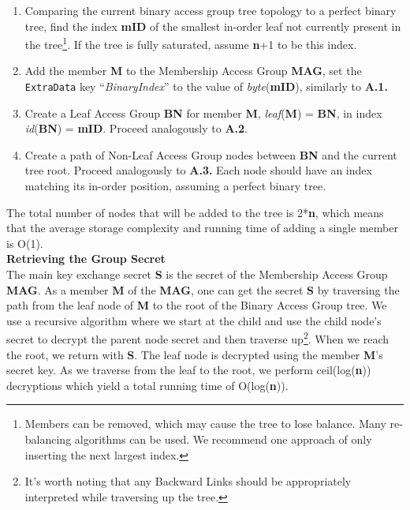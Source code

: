 \documentclass[oneside, 12pt]{article}
\newcommand{\fn}[1]{\footnote{\hangpara{1.4em}{1} #1}}
\begin{document}
\begin{enumerate}
  \item Comparing the current binary access group tree topology to a perfect binary tree, find the index \textbf{mID} of the smallest in-order leaf not currently present in the tree\fn{Members can be removed, which may cause the tree to lose balance. Many re-balancing algorithms can be used. We recommend one approach of only inserting the next largest index.}. If the tree is fully saturated, assume \textbf{n}+1 to be this index.
  \item Add the member \textbf{M} to the Membership Access Group \textbf{MAG}, set the \texttt{ExtraData} key “\textit{BinaryIndex}” to the value of \textit{byte}(\textbf{mID}), similarly to \textbf{A.1.}
  \item Create a Leaf Access Group \textbf{BN} for member \textbf{M}, \textit{leaf}(\textbf{M}) = \textbf{BN}, in index \textit{id}(\textbf{BN}) = \textbf{mID}. Proceed analogously to \textbf{A.2}.
  \item Create a path of Non-Leaf Access Group nodes between \textbf{BN} and the current tree root. Proceed analogously to \textbf{A.3.} Each node should have an index matching its in-order position, assuming a perfect binary tree.
\end{enumerate}

\noindent The total number of nodes that will be added to the tree is 2*\textbf{n}, which means that the average storage complexity and running time of adding a single member is O(1).\\

\noindent\textbf{Retrieving the Group Secret}\\
\noindent The main key exchange secret \textbf{S} is the secret of the Membership Access Group \textbf{MAG}. As a member \textbf{M} of the \textbf{MAG}, one can get the secret \textbf{S} by traversing the path from the leaf node of \textbf{M} to the root of the Binary Access Group tree. We use a recursive algorithm where we start at the child and use the child node’s secret to decrypt the parent node secret and then traverse up\fn{It’s worth noting that any Backward Links should be appropriately interpreted while traversing up the tree.}. When we reach the root, we return with \textbf{S}. The leaf node is decrypted using the member \textbf{M}’s secret key. As we traverse from the leaf to the root, we perform ceil(log(\textbf{n})) decryptions which yield a total running time of O(log(\textbf{n})).\\
\end{document}
